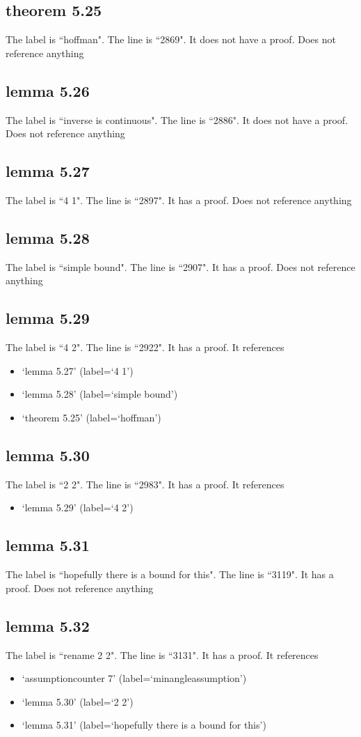 \documentclass{article}
\begin{document}
\subsection{theorem 5.25}
The label is ``hoffman".
The line is ``2869".
It does not have a proof.
Does not reference anything
\subsection{lemma 5.26}
The label is ``inverse is continuous".
The line is ``2886".
It does not have a proof.
Does not reference anything
\subsection{lemma 5.27}
The label is ``4 1".
The line is ``2897".
It has a proof.
Does not reference anything
\subsection{lemma 5.28}
The label is ``simple bound".
The line is ``2907".
It has a proof.
Does not reference anything
\subsection{lemma 5.29}
The label is ``4 2".
The line is ``2922".
It has a proof.
It references \begin{itemize}
\item `lemma 5.27' (label=`4 1')
\item `lemma 5.28' (label=`simple bound')
\item `theorem 5.25' (label=`hoffman')
\end{itemize}
\subsection{lemma 5.30}
The label is ``2 2".
The line is ``2983".
It has a proof.
It references \begin{itemize}
\item `lemma 5.29' (label=`4 2')
\end{itemize}
\subsection{lemma 5.31}
The label is ``hopefully there is a bound for this".
The line is ``3119".
It has a proof.
Does not reference anything
\subsection{lemma 5.32}
The label is ``rename 2 2".
The line is ``3131".
It has a proof.
It references \begin{itemize}
\item `assumptioncounter 7' (label=`minangleassumption')
\item `lemma 5.30' (label=`2 2')
\item `lemma 5.31' (label=`hopefully there is a bound for this')
\end{itemize}
\end{document}
